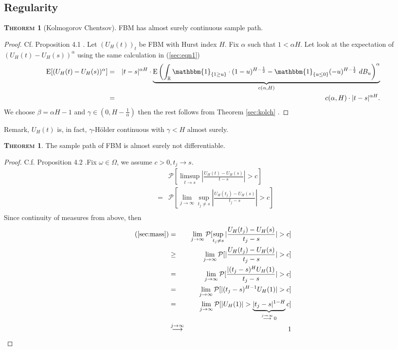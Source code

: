 \documentclass[a4paper, twoside, 11pt]{article}
\theoremstyle{definition}
\newtheorem{theorem}[definition]{\scshape Theorem}
\newcommand{\brkt}[1]{\left({#1} \right)}
\begin{document}
\subsection{Regularity}
\begin{theorem}[Kolmogorov Chentsov]
  FBM has almost surely continuous sample path.  
\end{theorem}

\begin{proof}
  Cf.\cite{mandelbrot} Proposition 4.1 . Let $(U_H(t))_{t}$ be FBM with Hurst index $H$. Fix $\alpha$ such that $1 < \alpha H$. Let look at the expectation of $(U_H(t) - U_H(s))^\alpha$ using the same calculation in (\ref{sec:eqn1})
  \begin{eqnarray}
	\mathrm{E} [(U_H(t) - U_H(s))^\alpha] &=& |t-s|^{\alpha H} \cdot \underbrace{\mathrm{E}\brkt{\int_{\mathbb{R}} \mathbbm{1}_{\{1\ge u\}}\cdot (1-u)^{H-\frac{1}{2}} - \mathbbm{1}_{\{u\le 0\}} (-u)^{H-\frac{1}{2}} \, \mathop{dB_u}}^\alpha}_{c(\alpha,H)}\nonumber\\
	&=& c(\alpha,H) \cdot |t-s|^{\alpha H}.
	\label{sec:eqn5}
  \end{eqnarray}
  We choose $\beta = \alpha H -1$ and $\gamma \in (0, H-\frac{1}{\alpha})$ then the rest follows from Theorem \ref{sec:kolch} .
\end{proof}

Remark, $U_H(t)$ is, in fact, $\gamma$-H\"older continuous with $\gamma < H$ almost surely.

\begin{theorem}
  The sample path of FBM is almost surely not differentiable.
\end{theorem}

\begin{proof}
  C.f. \cite{mandelbrot} Proposition 4.2 .Fix $\omega \in \Omega$, we assume $c > 0, t_j \rightarrow s$.
\begin{eqnarray}
 && \mathcal{P}[\limsup\limits_{t\rightarrow s} |\frac{U_H(t) - U_H(s)}{t-s}| > c]\nonumber\\
 &=& \mathcal{P}[\lim\limits_{j\rightarrow\infty}\sup\limits_{t_j\neq s} |\frac{U_H(t_j) - U_H(s)}{t_j-s}| > c]\nonumber\\
 \label{sec:mass}
 \end{eqnarray}
 Since continuity of measures from above, then
 \begin{eqnarray*}
 \text{(\ref{sec:mass})} &=& \lim\limits_{j\rightarrow\infty} \mathcal{P}[\sup\limits_{t_j\neq s} |\frac{U_H(t_j) - U_H(s)}{t_j-s}| > c]\\
 &\ge& \lim\limits_{j\rightarrow\infty} \mathcal{P}[|\frac{U_H(t_j) - U_H(s)}{t_j-s}| > c]\\
 &=& \lim\limits_{j\rightarrow\infty} \mathcal{P}[\frac{|(t_j-s)^{H}U_H(1)}{t_j - s}| > c]\\
 &=& \lim\limits_{j\rightarrow\infty} \mathcal{P}[|(t_j-s)^{H-1}U_H(1)| > c]\\
 &=& \lim\limits_{j\rightarrow\infty} \mathcal{P}[|U_H(1)| > \underbrace{|t_j - s|^{1-H}}_{\overset{j\rightarrow\infty}{\longrightarrow}\, 0}c]\\
 &\overset{j\rightarrow \infty}{\longrightarrow}& 1 
\end{eqnarray*}
\end{proof}
\end{document}
